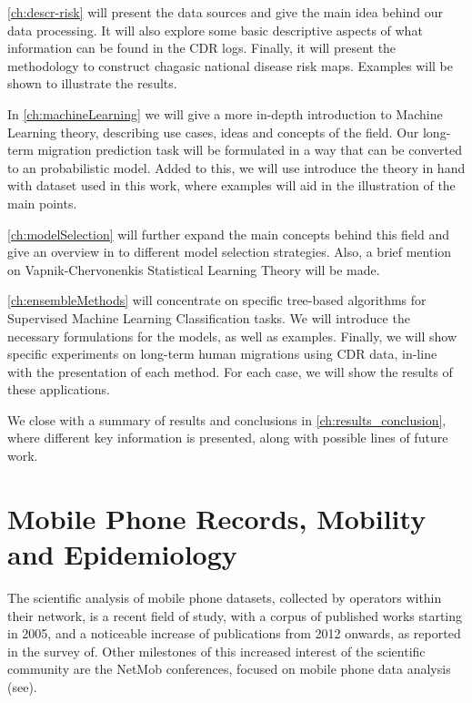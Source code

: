 
\cref{ch:descr-risk} will present the data sources and give the main idea behind our data processing. It will also explore some basic descriptive aspects of what information can be found in the CDR logs.
Finally, it will present the methodology to construct chagasic national disease risk maps.
Examples will be shown to illustrate the results.

In \cref{ch:machineLearning} we will give a more in-depth introduction to Machine Learning theory, describing use cases, ideas and concepts of the field.
Our long-term migration prediction task will be formulated in a way that can be converted to an probabilistic model.
Added to this, we will use introduce the theory in hand with dataset used in this work, where examples will aid in the illustration of the main points.

\cref{ch:modelSelection} will further expand the main concepts behind this field and give an overview in to different model selection strategies.
Also, a brief mention on Vapnik-Chervonenkis Statistical Learning Theory will be made.

\cref{ch:ensembleMethods} will concentrate on specific tree-based algorithms for Supervised Machine Learning Classification tasks.
We will introduce the necessary formulations for the models, as well as examples.
Finally, we will show specific experiments on long-term human migrations using CDR data, in-line with the presentation of each method.
For each case, we will show the results of these applications.

We close with a summary of results and conclusions in \cref{ch:results_conclusion}, where different key information is presented, along with possible lines of future work.

\section{Mobile Phone Records, Mobility and Epidemiology}

The scientific analysis of mobile phone datasets, collected by operators within their network, is a recent field of study, with a corpus of published works starting in 2005, and a noticeable increase of publications from 2012 onwards, as reported in the survey of\cite{naboulsi2015mobile}. Other milestones of this increased interest of the scientific community are the NetMob conferences, focused on mobile phone data analysis (see\cite{netmob}).

